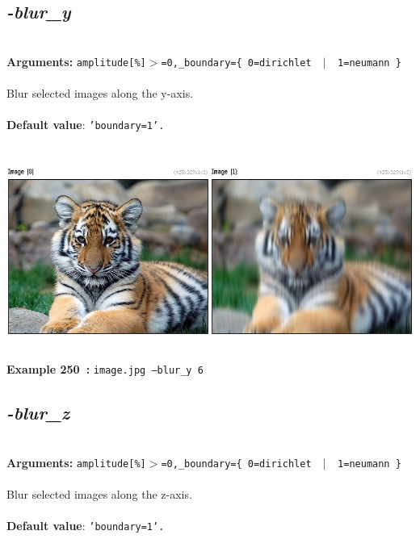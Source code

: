 \documentclass[a4paper,11pt,twoside]{book}
\begin{document}
\subsection{\emph{-blur\_y} }\vspace*{-0.5em}
~\\\textbf{Arguments: } 
{\small \texttt{amplitude[\%]$>$=0,\_boundary=\{ 0=dirichlet ~$|$~ 1=neumann \}}}\\~\\
Blur selected images along the y-axis.
~\\~\\\textbf{Default value}: {\small \texttt{'boundary=1'.}}
\begin{center}\includegraphics[keepaspectratio=true,height=7cm,width=\textwidth]{img/gmic_def250.jpg}\\
{\footnotesize \textbf{Example 250~:} \texttt{image.jpg --blur\_y 6}}
\end{center}

\subsection{\emph{-blur\_z} }\vspace*{-0.5em}
~\\\textbf{Arguments: } 
{\small \texttt{amplitude[\%]$>$=0,\_boundary=\{ 0=dirichlet ~$|$~ 1=neumann \}}}\\~\\
Blur selected images along the z-axis.
~\\~\\\textbf{Default value}: {\small \texttt{'boundary=1'.}}
\end{document}
